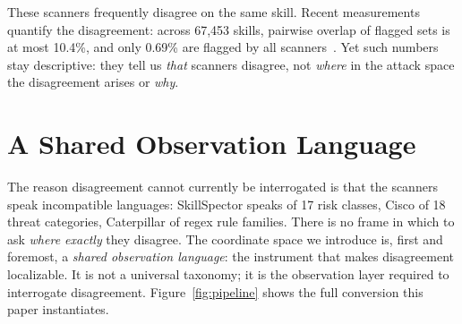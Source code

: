 \documentclass[sigconf,nonacm]{acmart}
\begin{document}
These scanners frequently disagree on the same skill. Recent measurements quantify the disagreement: across 67{,}453 skills, pairwise overlap of flagged sets is at most 10.4\%, and only 0.69\% are flagged by all scanners~\cite{clawhub2026}. Yet such numbers stay descriptive: they tell us \emph{that} scanners disagree, not \emph{where} in the attack space the disagreement arises or \emph{why}.

\section{A Shared Observation Language}
\label{sec:measure}

The reason disagreement cannot currently be interrogated is that the scanners speak incompatible languages: SkillSpector speaks of 17 risk classes, Cisco of 18 threat categories, Caterpillar of regex rule families. There is no frame in which to ask \emph{where exactly} they disagree. The coordinate space we introduce is, first and foremost, a \emph{shared observation language}: the instrument that makes disagreement localizable. It is not a universal taxonomy; it is the observation layer required to interrogate disagreement. Figure~\ref{fig:pipeline} shows the full conversion this paper instantiates.
\end{document}
